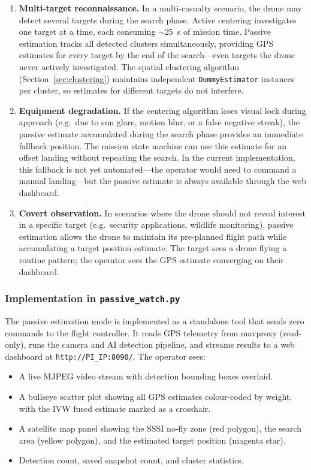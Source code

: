 \begin{enumerate}
  \item \textbf{Multi-target reconnaissance.}  In a multi-casualty scenario, the drone may detect several targets during the search phase.  Active centering investigates one target at a time, each consuming $\sim$\SI{25}{\second} of mission time.  Passive estimation tracks all detected clusters simultaneously, providing GPS estimates for every target by the end of the search---even targets the drone never actively investigated.  The spatial clustering algorithm (Section~\ref{sec:clustering}) maintains independent \texttt{DummyEstimator} instances per cluster, so estimates for different targets do not interfere.

  \item \textbf{Equipment degradation.}  If the centering algorithm loses visual lock during approach (e.g.\ due to sun glare, motion blur, or a false negative streak), the passive estimate accumulated during the search phase provides an immediate fallback position.  The mission state machine can use this estimate for an offset landing without repeating the search.  In the current implementation, this fallback is not yet automated---the operator would need to command a manual landing---but the passive estimate is always available through the web dashboard.

  \item \textbf{Covert observation.}  In scenarios where the drone should not reveal interest in a specific target (e.g.\ security applications, wildlife monitoring), passive estimation allows the drone to maintain its pre-planned flight path while accumulating a target position estimate.  The target sees a drone flying a routine pattern; the operator sees the GPS estimate converging on their dashboard.
\end{enumerate}

\subsubsection{Implementation in \texttt{passive\_watch.py}}

The passive estimation mode is implemented as a standalone tool that sends zero commands to the flight controller.  It reads GPS telemetry from mavproxy (read-only), runs the camera and AI detection pipeline, and streams results to a web dashboard at \texttt{http://PI\_IP:8090/}.  The operator sees:

\begin{itemize}
  \item A live MJPEG video stream with detection bounding boxes overlaid.
  \item A bullseye scatter plot showing all GPS estimates colour-coded by weight, with the IVW fused estimate marked as a crosshair.
  \item A satellite map panel showing the SSSI no-fly zone (red polygon), the search area (yellow polygon), and the estimated target position (magenta star).
  \item Detection count, saved snapshot count, and cluster statistics.
\end{itemize}


